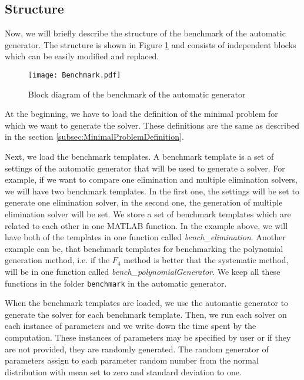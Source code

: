 \subsection{Structure}
Now, we will briefly describe the structure of the benchmark of the automatic generator. The structure is shown in Figure \ref{autogen:benchmark} and consists of independent blocks which can be easily modified and replaced.

\begin{figure}[ht]
  \centering
  \vspace{0.5cm}
  \texttt{[image: Benchmark.pdf]}
  \vspace{0.5cm}
  \caption{Block diagram of the benchmark of the automatic generator}
  \label{autogen:benchmark}
\end{figure}

At the beginning, we have to load the definition of the minimal problem for which we want to generate the solver. These definitions are the same as described in the section \ref{subsec:MinimalProblemDefinition}.

Next, we load the benchmark templates. A benchmark template is a set of settings of the automatic generator that will be used to generate a solver. For example, if we want to compare one elimination and multiple elimination solvers, we will have two benchmark templates. In the first one, the settings will be set to generate one elimination solver, in the second one, the generation of multiple elimination solver will be set. We store a set of benchmark templates which are related to each other in one MATLAB function. In the example above, we will have both of the templates in one function called \textit{bench\_elimination}. Another example can be, that benchmark templates for benchmarking the polynomial generation method, i.e. if the $F_4$ method is better that the systematic method, will be in one function called \textit{bench\_polynomialGenerator}. We keep all these functions in the folder \texttt{benchmark} in the automatic generator.

When the benchmark templates are loaded, we use the automatic generator to generate the solver for each benchmark template. Then, we run each solver on each instance of parameters and we write down the time spent by the computation. These instances of parameters may be specified by user or if they are not provided, they are randomly generated. The random generator of parameters assign to each parameter random number from the normal distribution with mean set to zero and standard deviation to one.

